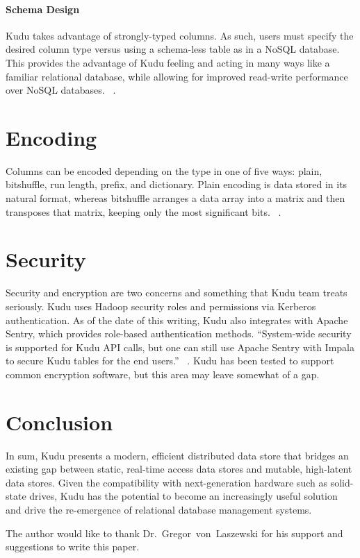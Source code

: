 \paragraph{Schema Design} Kudu takes advantage of strongly-typed columns. As such, users must specify the desired column type versus using a schema-less table as in a NoSQL database.  This provides the advantage of Kudu feeling and acting in many ways like a familiar relational database, while allowing for improved read-write performance over NoSQL databases. ~\cite{hid-sp18-407-kudu-schema-design}.
\section{Encoding} Columns can be encoded depending on the type in one of five ways: plain, bitshuffle, run length, prefix, and dictionary. Plain encoding is data stored in its natural format, whereas bitshuffle arranges a data array into a matrix and then transposes that matrix, keeping only the most significant bits. ~\cite{hid-sp18-407-bitshuffle}.
\section{Security} Security and encryption are two concerns and something that Kudu team treats seriously. Kudu uses Hadoop security roles and permissions via Kerberos authentication. As of the date of this writing, Kudu also integrates with Apache Sentry, which provides role-based authentication methods. ``System-wide security is supported for Kudu API calls, but one can still use Apache Sentry with Impala to secure Kudu tables for the end users.'' ~\cite{hid-sp18-407-benchmarking-kudu}. Kudu has been tested to support common encryption software, but this area may leave somewhat of a gap.
\section{Conclusion} In sum, Kudu presents a modern, efficient distributed data store that bridges an existing gap between static, real-time access data stores and mutable, high-latent data stores. Given the compatibility with next-generation hardware such as solid-state drives, Kudu has the potential to become an increasingly useful solution and drive the re-emergence of relational database management systems.
\begin{acks}
The author would like to thank Dr.~Gregor~von~Laszewski for his support and suggestions to write this paper.
\end{acks}


